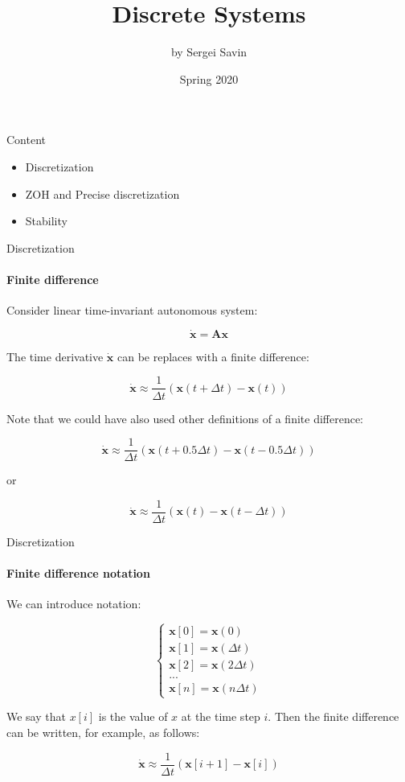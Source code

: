 \documentclass{beamer}
\title{Discrete Systems}
\author{by Sergei Savin}
\date{Spring 2020}
\begin{document}
\maketitle


\begin{frame}{Content}
\begin{itemize}
\item Discretization
\item ZOH and Precise discretization
\item Stability
\end{itemize}
\end{frame}

\begin{frame}{Discretization}
\framesubtitle{Finite difference}
\begin{flushleft}

Consider linear time-invariant autonomous system:

\[
\dot {\mathbf x} = \mathbf A \mathbf x
\]

The time derivative $\dot {\mathbf x}$ can be replaces with a finite difference:

\[
\dot {\mathbf x} \approx \frac{1}{\Delta t}(\mathbf x(t + \Delta t) - \mathbf x(t))
\]

Note that we could have also used other definitions of a finite difference:

\[
\dot {\mathbf x} \approx \frac{1}{\Delta t}(\mathbf x(t + 0.5\Delta t) - \mathbf x(t - 0.5\Delta t))
\]

or

\[
\dot {\mathbf x} \approx \frac{1}{\Delta t}(\mathbf x(t) - \mathbf x(t - \Delta t))
\]

\end{flushleft}
\end{frame}

\begin{frame}{Discretization}
\framesubtitle{Finite difference notation}
\begin{flushleft}
We can introduce notation:

\[
\begin{cases}
\mathbf x[0] = \mathbf x(0) \\
\mathbf x[1] = \mathbf x(\Delta t) \\
\mathbf x[2] = \mathbf x(2\Delta t) \\
... \\
\mathbf x[n] = \mathbf x(n\Delta t) 
\end{cases}
\]

We say that $ x[i]$ is the value of $x$ at the time step $i$. Then the finite difference can be written, for example, as follows:

\[
\dot {\mathbf x} \approx \frac{1}{\Delta t}(\mathbf x[i + 1] - \mathbf x[i])
\]

\end{flushleft}
\end{frame}
\end{document}
